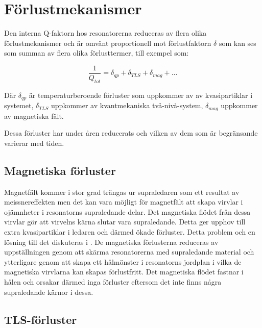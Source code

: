 \documentclass[main.tex]{subfiles}
\begin{document}

\section{Förlustmekanismer}
\label{sec:losses}
Den interna Q-faktorn hos resonatorerna reduceras av flera olika förlustmekanismer och är omvänt proportionell mot förlustfaktorn $\delta$ som kan ses som summan av flera olika förlusttermer\cite{Boehme2016,Goetz2016}, till exempel som:

\begin{equation}
    \label{ekv:Qtot}
    \frac{1}{Q_{tot}}=\delta_{qp}+\delta_{TLS}+\delta_{mag}+...
\end{equation}
\noindent

Där $\delta_{qp}$ är temperaturberoende förluster som uppkommer av av kvasipartiklar i systemet, $\delta_{TLS}$ uppkommer av kvantmekaniska två-nivå-system, $\delta_{mag}$ uppkommer av magnetiska fält. 

Dessa förluster har under åren reducerats och vilken av dem som är begränsande varierar med tiden.

\subsection{Magnetiska förluster}
\label{sek:mag}
Magnetfält kommer i stor grad trängas ur supraledaren som ett resultat av meissnereffekten men det kan vara möjligt för magnetfält att skapa virvlar i ojämnheter i resonatorns supraledande delar. Det magnetiska flödet från dessa virvlar gör att virvelns kärna slutar vara supraledande. Detta ger upphov till extra kvasipartiklar i ledaren och därmed ökade förluster. Detta problem och en lösning till det diskuteras i \cite{Chiaro2016}. De magnetiska förlusterna reduceras av uppställningen genom att skärma resonatorerna med supraledande material och ytterligare genom att skapa ett hålmönster i resonatorns jordplan i vilka de magnetiska virvlarna kan skapas förlustfritt\cite{Chiaro2016}. Det magnetiska flödet fastnar i hålen och orsakar därmed inga förluster\cite{Chiaro2016} eftersom det inte finns några supraledande kärnor i dessa.

\subsection{TLS-förluster}
\end{document}
